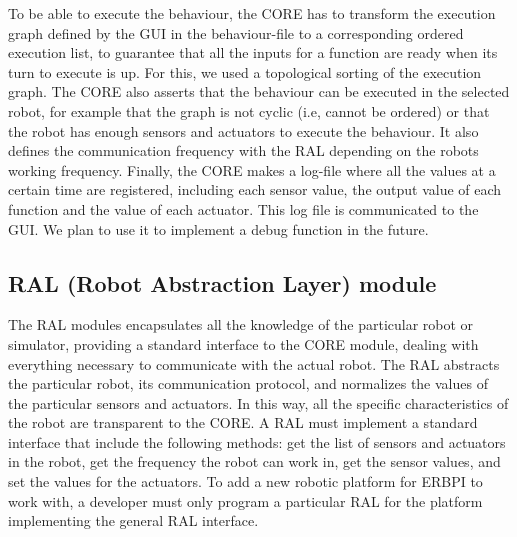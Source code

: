 To be able to execute the behaviour, the CORE has to transform the execution graph defined by the GUI in the behaviour-file to a corresponding ordered execution list, to guarantee that all the inputs for a function are ready when its turn to execute is up. For this, we used a topological sorting \cite{topologicalSorting} of the execution graph. The CORE also asserts that the behaviour can be executed in the selected robot, for example that the graph is not cyclic (i.e, cannot be ordered) or that the robot has enough sensors and actuators to execute the behaviour. It also defines the communication frequency with the RAL depending on the robots working frequency. Finally, the CORE makes a log-file where all the values at a certain time are registered, including each sensor value, the output value of each function and the value of each actuator. This log file is communicated to the GUI. We plan to use it to implement a debug function in the future. 



\subsection{RAL (Robot Abstraction Layer) module}
\label{sec:RAL}

The RAL modules encapsulates all the knowledge of the particular robot or simulator, providing a standard interface to the CORE module, dealing with everything necessary to communicate with the actual robot. The RAL abstracts the particular robot, its communication protocol, and normalizes the values of the particular sensors and actuators. In this way, all the specific characteristics of the robot are transparent to the CORE. A RAL must implement a standard interface that include the following methods:  get the list of sensors and actuators in the robot, get the frequency the robot can work in, get the sensor values, and set the values for the actuators. To add a new robotic platform for ERBPI to work with, a developer must only program a particular RAL for the platform implementing the general RAL interface.

